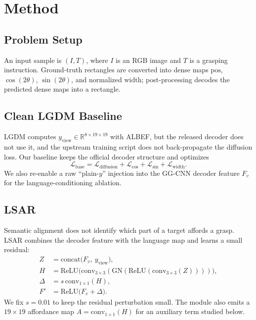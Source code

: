 \section{Method}
\subsection{Problem Setup}
An input sample is $(I,T)$, where $I$ is an RGB image and $T$ is a grasping
instruction.  Ground-truth rectangles are converted into dense maps
$\mathrm{pos}$, $\cos(2\theta)$, $\sin(2\theta)$, and normalized
$\mathrm{width}$; post-processing decodes the predicted dense maps into a
rectangle.

\subsection{Clean LGDM Baseline}
LGDM computes $y_{\mathrm{view}}\in\mathbb{R}^{8\times19\times19}$ with
ALBEF, but the released decoder does not use it, and the upstream training
script does not back-propagate the diffusion loss.  Our baseline keeps the
official decoder structure and optimizes
\begin{equation}
  \mathcal{L}_{\mathrm{base}} =
  \mathcal{L}_{\mathrm{diffusion}}
  + \mathcal{L}_{\cos}
  + \mathcal{L}_{\sin}
  + \mathcal{L}_{\mathrm{width}}.
  \label{eq:base}
\end{equation}
We also re-enable a raw ``plain-$y$'' injection into the GG-CNN decoder
feature $F_v$ for the language-conditioning ablation.

\subsection{LSAR}
Semantic alignment does not identify which part of a target affords a grasp.
LSAR combines the decoder feature with the language map and learns a small
residual:
\begin{align}
  Z &= \mathrm{concat}\bigl(F_v,\ y_{\mathrm{view}}\bigr), \\
  H &= \mathrm{ReLU}\bigl(\mathrm{conv}_{3\times3}(
        \mathrm{GN}(\mathrm{ReLU}(
          \mathrm{conv}_{3\times3}(Z))))\bigr), \\
  \Delta &= s\,\mathrm{conv}_{1\times1}(H), \\
  F' &= \mathrm{ReLU}\bigl(F_v+\Delta\bigr).
\end{align}
We fix $s=0.01$ to keep the residual perturbation small.  The module also
emits a $19\times19$ affordance map
$A=\mathrm{conv}_{1\times1}(H)$ for an auxiliary term studied below.

